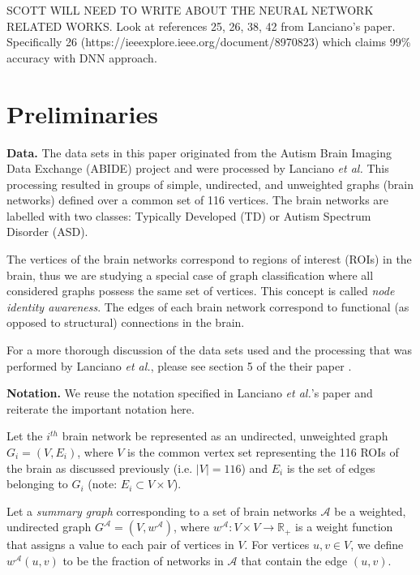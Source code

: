 \documentclass[letterpaper]{article}
\begin{document}
SCOTT WILL NEED TO WRITE ABOUT THE NEURAL NETWORK RELATED WORKS. Look at references 25, 26, 38, 42 from Lanciano's paper. Specifically 26 (https://ieeexplore.ieee.org/document/8970823) which claims 99\% accuracy with DNN approach.

\section{Preliminaries}
\textbf{Data.}
The data sets in this paper originated from the Autism Brain Imaging Data Exchange (ABIDE) project \cite{craddock2013} and were processed by Lanciano \emph{et al.}
This processing resulted in groups of simple, undirected, and unweighted graphs (brain networks) defined over a common set of 116 vertices.
The brain networks are labelled with two classes: Typically Developed (TD) or Autism Spectrum Disorder (ASD).

The vertices of the brain networks correspond to regions of interest (ROIs) in the brain, thus we are studying a special case of graph classification where all considered graphs possess the same set of vertices.
This concept is called \emph{node identity awareness}.
The edges of each brain network correspond to functional (as opposed to structural) connections in the brain.

For a more thorough discussion of the data sets used and the processing that was performed by Lanciano \emph{et al.}, please see section 5 of the their paper \cite{lanciano2020}.

\textbf{Notation.}
We reuse the notation specified in Lanciano \emph{et al.}'s paper and reiterate the important notation here.

Let the $i^{th}$ brain network be represented as an undirected, unweighted graph $G_i = (V, E_i)$, where $V$ is the common vertex set representing the 116 ROIs of the brain as discussed previously (i.e. $|V| = 116$) and $E_i$ is the set of edges belonging to $G_i$ (note: $E_i \subset V \times V$).

Let a \emph{summary graph} corresponding to a set of brain networks $\mathcal{A}$ be a weighted, undirected graph $G^{\mathcal{A}} = (V, w^{\mathcal{A}})$, where $w^{\mathcal{A}}: V \times V \rightarrow \mathbb{R}_+$ is a weight function that assigns a value to each pair of vertices in $V$.
For vertices $u,v \in V$, we define $w^{\mathcal{A}}(u,v)$ to be the fraction of networks in $\mathcal{A}$ that contain the edge $(u,v)$.
\end{document}
